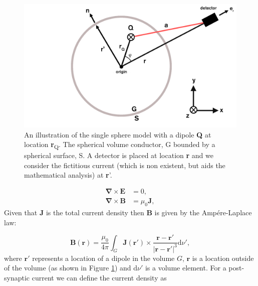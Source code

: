 \begin{figure}
	\begin{center}
		\includegraphics[width=\linewidth]{./images/chapter2/Figure_1.png}
		\caption{An illustration of the single sphere model with a dipole \textbf{Q} at location \textbf{r}\textsubscript{Q}. The spherical volume conductor, G bounded by a spherical surface, S. A detector is placed at location \textbf{r} and we consider the fictitious current (which is non existent, but aids the mathematical analysis) at \textbf{r}'. \label{figure_2_1}}
	\end{center}
\end{figure}

\begin{equation}
	\begin{aligned}
	\mathbf{\nabla}\times\mathbf{E} &= 0, \\
	\mathbf{\nabla}\times\mathbf{B} &= \mu_0\mathbf{J}, 
	\end{aligned}\label{eqn_sarvas1a}
\end{equation} Given that $\mathbf{J}$ is the total current density then $\mathbf{B}$ is given by the Ampére-Laplace law:

\begin{equation}
\mathbf{B}(\mathbf{r}) = \frac{\mu_0}{4\pi}\int_{G}\mathbf{J}(\mathbf{r}')\times\frac{\mathbf{r}-\mathbf{r}'}{|\mathbf{r}-\mathbf{r}'|^3}\text{d}\nu', \label{eqn_sarvas2}
\end{equation} where $\mathbf{r}'$ represents a location of a dipole in the volume $G$, $\mathbf{r}$ is a location outside of the volume (as shown in Figure \ref{figure_2_1}) and $\text{d}\nu'$ is a volume element. For a post-synaptic current we can define the current density as

